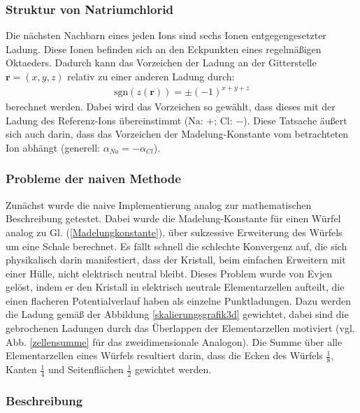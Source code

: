 \documentclass[10pt,a4paper]{article}
\begin{document}
\subsubsection{Struktur von Natriumchlorid}

Die nächsten Nachbarn eines jeden Ions sind sechs Ionen entgegengesetzter
Ladung. Diese Ionen befinden sich an den Eckpunkten eines regelmäßigen
Oktaeders. Dadurch kann das Vorzeichen der Ladung an der Gitterstelle
$\mathbf{r} = \left( x,y,z \right)$ relativ zu einer anderen Ladung durch:
\begin{align}
\mathrm{sgn}\left(z(\mathbf{r})\right) = \pm \left( -1 \right)^{x+y+z}
\label{eq:vorzeichen}
\end{align}
berechnet werden. Dabei wird das Vorzeichen so gewählt, dass dieses mit der Ladung
des Referenz-Ions übereinstimmt (Na: $+$; Cl: $-$). Diese Tatsache
äußert sich auch darin, dass das Vorzeichen der Madelung-Konstante vom
betrachteten Ion abhängt (generell: $\alpha_{Na} = - \alpha_{Cl}$).
\subsubsection{Probleme der naiven Methode}

Zunächst wurde die naive Implementierung analog zur mathematischen Beschreibung
getestet. Dabei wurde die Madelung-Konstante für einen Würfel analog zu
Gl. (\ref{Madelungkonstante}), über sukzessive Erweiterung des Würfels um eine
Schale berechnet. Es fällt schnell die schlechte Konvergenz auf, die sich
physikalisch darin manifestiert, dass der Kristall, beim einfachen Erweitern
mit einer Hülle, nicht elektrisch neutral bleibt. Dieses Problem wurde von Evjen
\cite{Evjen} gelöst, indem er den Kristall in elektrisch neutrale Elementarzellen
aufteilt, die einen flacheren Potentialverlauf haben als einzelne Punktladungen.
Dazu werden die Ladung gemäß der Abbildung \ref{skalierungsgrafik3d} gewichtet,
dabei sind die gebrochenen Ladungen durch das Überlappen der Elementarzellen motiviert
(vgl. Abb. \ref{zellensumme} für das zweidimensionale Analogon). Die Summe über 
alle Elementarzellen eines Würfels resultiert darin, dass die Ecken des Würfels
$\frac{1}{8}$, Kanten $\frac{1}{4}$ und Seitenflächen $\frac{1}{2}$ gewichtet werden.

\subsubsection{Beschreibung}
\end{document}
